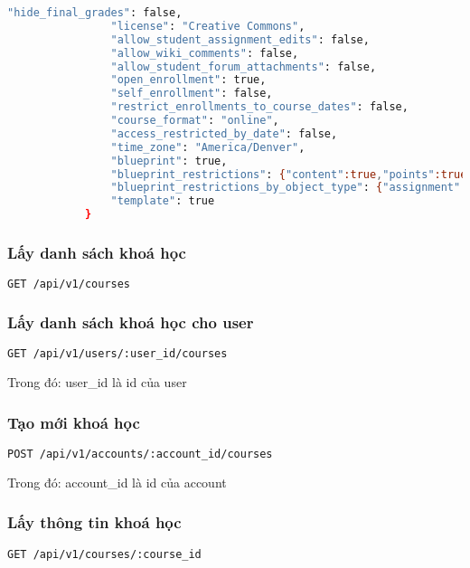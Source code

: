 \documentclass[../Thesis.tex]{subfiles}
\begin{document}
\begin{lstlisting}[language=bash]
                "hide_final_grades": false,
                "license": "Creative Commons",
                "allow_student_assignment_edits": false,
                "allow_wiki_comments": false,
                "allow_student_forum_attachments": false,
                "open_enrollment": true,
                "self_enrollment": false,
                "restrict_enrollments_to_course_dates": false,
                "course_format": "online",
                "access_restricted_by_date": false,
                "time_zone": "America/Denver",
                "blueprint": true,
                "blueprint_restrictions": {"content":true,"points":true,"due_dates":false,"availability_dates":false},
                "blueprint_restrictions_by_object_type": {"assignment":{"content":true,"points":true},"wiki_page":{"content":true}},
                "template": true
            }
            \end{lstlisting}

            \subsubsection{Lấy danh sách khoá học}
                \begin{lstlisting}[language=bash]
                    GET /api/v1/courses
                \end{lstlisting}

            \subsubsection{Lấy danh sách khoá học cho user}
            \begin{lstlisting}[language=bash]
                GET /api/v1/users/:user_id/courses
            \end{lstlisting}

            Trong đó: user\_id là id của user

            \subsubsection{Tạo mới khoá học}
            \begin{lstlisting}[language=bash]
                POST /api/v1/accounts/:account_id/courses
            \end{lstlisting}

            Trong đó: account\_id là id của account

            \subsubsection{Lấy thông tin khoá học}
            \begin{lstlisting}[language=bash]
                GET /api/v1/courses/:course_id
            \end{lstlisting}
\end{document}
